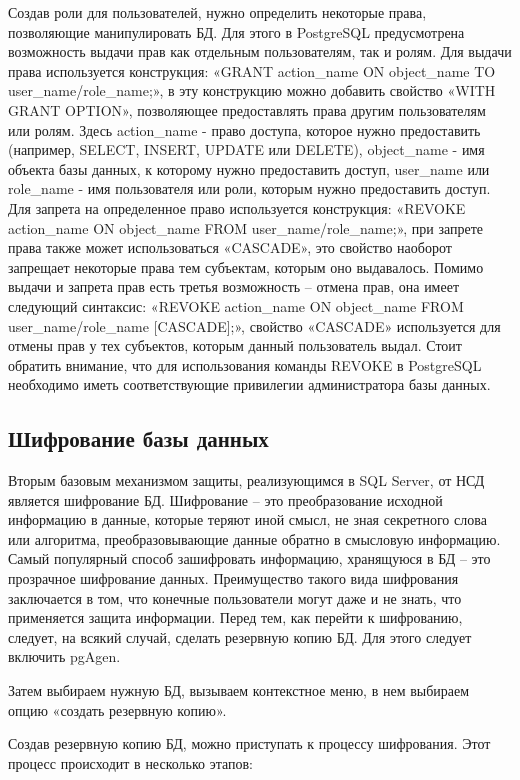 Создав роли для пользователей, нужно определить некоторые права, позволяющие манипулировать БД. Для этого в PostgreSQL предусмотрена возможность выдачи прав как отдельным пользователям, так и ролям. Для выдачи права используется конструкция: «GRANT action\_name ON object\_name TO user\_name/role\_name;», в эту конструкцию можно добавить свойство «WITH GRANT OPTION», позволяющее предоставлять права другим пользователям или ролям. Здесь action\_name - право доступа, которое нужно предоставить (например, SELECT, INSERT, UPDATE или DELETE), object\_name - имя объекта базы данных, к которому нужно предоставить доступ, user\_name или role\_name - имя пользователя или роли, которым нужно предоставить доступ. Для запрета на определенное право используется конструкция: «REVOKE action\_name ON object\_name FROM user\_name/role\_name;», при запрете права также может использоваться «CASCADE», это свойство наоборот запрещает некоторые права тем субъектам, которым оно выдавалось. Помимо выдачи и запрета прав есть третья возможность – отмена прав, она имеет следующий синтаксис: «REVOKE action\_name ON object\_name FROM user\_name/role\_name [CASCADE];», свойство «CASCADE» используется для отмены прав у тех субъектов, которым данный пользователь выдал. Стоит обратить внимание, что для использования команды REVOKE в PostgreSQL необходимо иметь соответствующие привилегии администратора базы данных.



\subsection{Шифрование базы данных}

Вторым базовым механизмом защиты, реализующимся в SQL Server, от НСД является шифрование БД. Шифрование – это преобразование исходной информацию в данные, которые теряют иной смысл, не зная секретного слова или алгоритма, преобразовывающие данные обратно в смысловую информацию. Самый популярный способ зашифровать информацию, хранящуюся в БД – это прозрачное шифрование данных. Преимущество такого вида шифрования заключается в том, что конечные пользователи могут даже и не знать, что применяется защита информации. 
Перед тем, как перейти к шифрованию, следует, на всякий случай, сделать резервную копию БД. Для этого следует включить pgAgen.

Затем выбираем нужную БД, вызываем контекстное меню, в нем выбираем опцию «создать резервную копию».

Создав резервную копию БД, можно приступать к процессу шифрования. Этот процесс происходит в несколько этапов:

